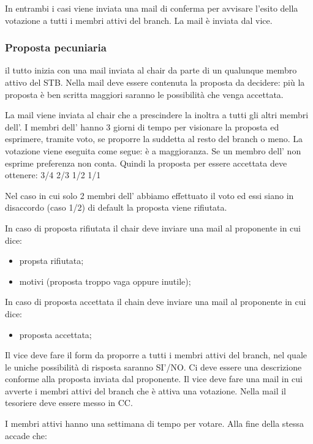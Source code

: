 \documentclass[pdf]{article}
\theoremstyle{definition}
\begin{document}
In entrambi i casi viene inviata una mail di conferma per  avvisare l'esito della votazione a tutti i membri attivi del branch. La mail è inviata dal vice.

\subsubsection{Proposta pecuniaria}

il tutto inizia con una mail inviata al chair da parte di un qualunque membro attivo del STB. Nella mail deve essere contenuta la proposta da decidere: più la proposta è ben scritta maggiori saranno le possibilità che venga accettata. 

La mail viene inviata al chair che a prescindere la inoltra a tutti gli altri membri dell'\EC{}. I membri dell'\EC{} hanno 3 giorni di tempo per visionare la proposta ed esprimere, tramite voto, se proporre la suddetta al resto del branch o meno.
La votazione viene eseguita come segue:
è a maggioranza. Se un membro dell'\EC{} non esprime preferenza non conta. Quindi la proposta per essere accettata deve ottenere:
3/4
2/3
1/2
1/1

Nel caso in cui solo 2 membri dell'\EC{} abbiamo effettuato il voto ed essi siano in disaccordo (caso 1/2) di default la proposta viene rifiutata.

In caso di proposta rifiutata il chair deve inviare una mail al proponente in cui dice:
\begin{itemize}
	\item propsta rifiutata;
	\item motivi (proposta troppo vaga oppure inutile);
\end{itemize}

In caso di proposta accettata il chain deve inviare una mail al proponente in cui dice:
\begin{itemize}
	\item proposta accettata;
\end{itemize}

Il vice deve fare il form da proporre a tutti i membri attivi del branch, nel quale le uniche possibilità di risposta saranno SI'/NO. Ci deve essere una descrizione conforme alla proposta inviata dal proponente. 
Il vice deve fare una mail in cui avverte i membri attivi del branch che è attiva una votazione. Nella mail il tesoriere deve essere messo in CC.

I membri attivi hanno una settimana di tempo per votare. Alla fine della stessa accade che:
\end{document}
